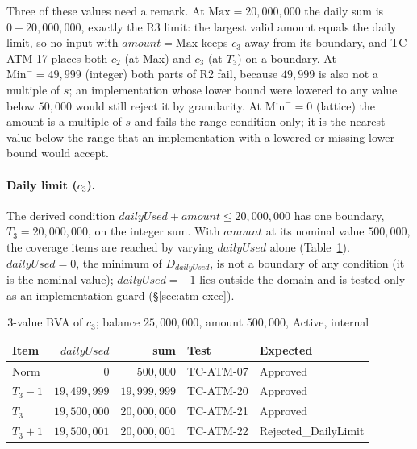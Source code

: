 \documentclass[11pt,a4paper]{article}
\newcommand{\Norm}{\mathrm{Norm}}
\begin{document}
Three of these values need a remark. At \(\mathrm{Max}=20{,}000{,}000\) the
daily sum is \(0+20{,}000{,}000\), exactly the R3 limit: the largest valid
amount equals the daily limit, so no input with \(\mathit{amount}=\mathrm{Max}\)
keeps \(c_3\) away from its boundary, and TC-ATM-17 places both \(c_2\) (at
Max) and \(c_3\) (at \(T_3\)) on a boundary. At \(\mathrm{Min}^-=49{,}999\)
(integer) both parts of R2 fail, because \(49{,}999\) is also not a multiple
of \(s\); an implementation whose lower bound were lowered to any value
below \(50{,}000\) would still reject it by granularity. At
\(\mathrm{Min}^-=0\) (lattice) the amount is a multiple of \(s\) and fails
the range condition only; it is the nearest value below the range that an
implementation with a lowered or missing lower bound would accept.

\paragraph{Daily limit (\(c_3\)).} The derived condition
\(\mathit{dailyUsed}+\mathit{amount}\le20{,}000{,}000\) has one boundary,
\(T_3=20{,}000{,}000\), on the integer sum. With \(\mathit{amount}\) at its
nominal value \(500{,}000\), the coverage items are reached by varying
\(\mathit{dailyUsed}\) alone (Table~\ref{tab:atm-daily-bva}).
\(\mathit{dailyUsed}=0\), the minimum of \(D_{\mathit{dailyUsed}}\), is not a
boundary of any condition (it is the nominal value); \(\mathit{dailyUsed}=-1\)
lies outside the domain and is tested only as an implementation guard
(\S\ref{sec:atm-exec}).

\begin{table}[H]
\centering
\caption{3-value BVA of \(c_3\); balance \(25{,}000{,}000\), amount \(500{,}000\), Active, internal}
\label{tab:atm-daily-bva}
\small
\begin{tabular}{l r r l l}
\toprule
Item & \(\mathit{dailyUsed}\) & sum & Test & Expected \\
\midrule
\(\Norm\) & \(0\) & \(500{,}000\) & TC-ATM-07 & Approved \\
\(T_3-1\) & \(19{,}499{,}999\) & \(19{,}999{,}999\) & TC-ATM-20 & Approved \\
\(T_3\) & \(19{,}500{,}000\) & \(20{,}000{,}000\) & TC-ATM-21 & Approved \\
\(T_3+1\) & \(19{,}500{,}001\) & \(20{,}000{,}001\) & TC-ATM-22 & Rejected\_DailyLimit \\
\bottomrule
\end{tabular}
\end{table}
\end{document}
